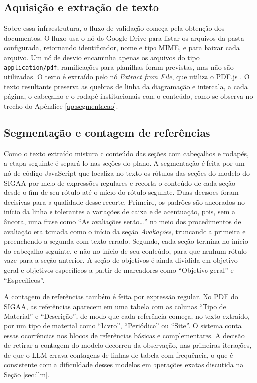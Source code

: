 \subsection{Aquisição e extração de texto}

Sobre essa infraestrutura, o fluxo de validação começa pela obtenção dos documentos. O fluxo usa o nó do Google Drive para listar os arquivos da pasta configurada, retornando identificador, nome e tipo MIME, e para baixar cada arquivo. Um nó de desvio encaminha apenas os arquivos do tipo \texttt{application/pdf}; ramificações para planilhas foram previstas, mas não são utilizadas. O texto é extraído pelo nó \textit{Extract from File}, que utiliza o PDF.js \cite{PDFjs}. O texto resultante preserva as quebras de linha da diagramação e intercala, a cada página, o cabeçalho e o rodapé institucionais com o conteúdo, como se observa no trecho do Apêndice \ref{ap:segmentacao}.

\subsection{Segmentação e contagem de referências}

Como o texto extraído mistura o conteúdo das seções com cabeçalhos e rodapés, a etapa seguinte é separá-lo nas seções do plano. A segmentação é feita por um nó de código JavaScript que localiza no texto os rótulos das seções do modelo do SIGAA por meio de expressões regulares e recorta o conteúdo de cada seção desde o fim de seu rótulo até o início do rótulo seguinte. Duas decisões foram decisivas para a qualidade desse recorte. Primeiro, os padrões são ancorados no início da linha e tolerantes a variações de caixa e de acentuação, pois, sem a âncora, uma frase como ``As avaliações serão\ldots'' no meio dos procedimentos de avaliação era tomada como o início da seção \textit{Avaliações}, truncando a primeira e preenchendo a segunda com texto errado. Segundo, cada seção termina no início do cabeçalho seguinte, e não no início de seu conteúdo, para que nenhum rótulo vaze para a seção anterior. A seção de objetivos é ainda dividida em objetivo geral e objetivos específicos a partir de marcadores como ``Objetivo geral'' e ``Específicos''.

A contagem de referências também é feita por expressão regular. No PDF do SIGAA, as referências aparecem em uma tabela com as colunas ``Tipo de Material'' e ``Descrição'', de modo que cada referência começa, no texto extraído, por um tipo de material como ``Livro'', ``Periódico'' ou ``Site''. O sistema conta essas ocorrências nos blocos de referências básicas e complementares. A decisão de retirar a contagem do modelo decorreu da observação, nas primeiras iterações, de que o LLM errava contagens de linhas de tabela com frequência, o que é consistente com a dificuldade desses modelos em operações exatas discutida na Seção \ref{sec:llm}.

